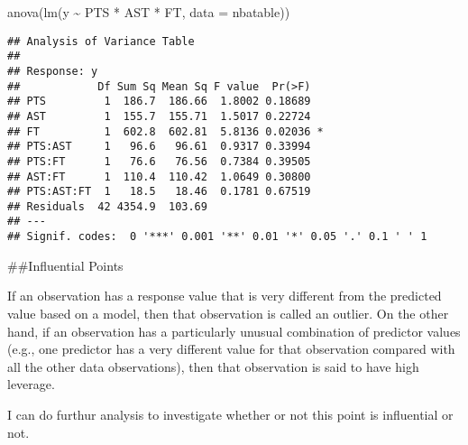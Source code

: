 \documentclass[
]{article}
\newenvironment{Shaded}{\begin{snugshade}}{\end{snugshade}}
\newcommand{\AttributeTok}[1]{\textcolor[rgb]{0.77,0.63,0.00}{#1}}
\newcommand{\FunctionTok}[1]{\textcolor[rgb]{0.00,0.00,0.00}{#1}}
\newcommand{\NormalTok}[1]{#1}
\newcommand{\SpecialCharTok}[1]{\textcolor[rgb]{0.00,0.00,0.00}{#1}}
\begin{document}
\begin{Shaded}
\begin{Highlighting}[]
\FunctionTok{anova}\NormalTok{(}\FunctionTok{lm}\NormalTok{(y }\SpecialCharTok{\textasciitilde{}}\NormalTok{ PTS }\SpecialCharTok{*}\NormalTok{ AST }\SpecialCharTok{*}\NormalTok{ FT, }\AttributeTok{data =}\NormalTok{ nbatable))}
\end{Highlighting}
\end{Shaded}

\begin{verbatim}
## Analysis of Variance Table
## 
## Response: y
##            Df Sum Sq Mean Sq F value  Pr(>F)  
## PTS         1  186.7  186.66  1.8002 0.18689  
## AST         1  155.7  155.71  1.5017 0.22724  
## FT          1  602.8  602.81  5.8136 0.02036 *
## PTS:AST     1   96.6   96.61  0.9317 0.33994  
## PTS:FT      1   76.6   76.56  0.7384 0.39505  
## AST:FT      1  110.4  110.42  1.0649 0.30800  
## PTS:AST:FT  1   18.5   18.46  0.1781 0.67519  
## Residuals  42 4354.9  103.69                  
## ---
## Signif. codes:  0 '***' 0.001 '**' 0.01 '*' 0.05 '.' 0.1 ' ' 1
\end{verbatim}

\#\#Influential Points

If an observation has a response value that is very different from the
predicted value based on a model, then that observation is called an
outlier. On the other hand, if an observation has a particularly unusual
combination of predictor values (e.g., one predictor has a very
different value for that observation compared with all the other data
observations), then that observation is said to have high leverage.

I can do furthur analysis to investigate whether or not this point is
influential or not.
\end{document}

